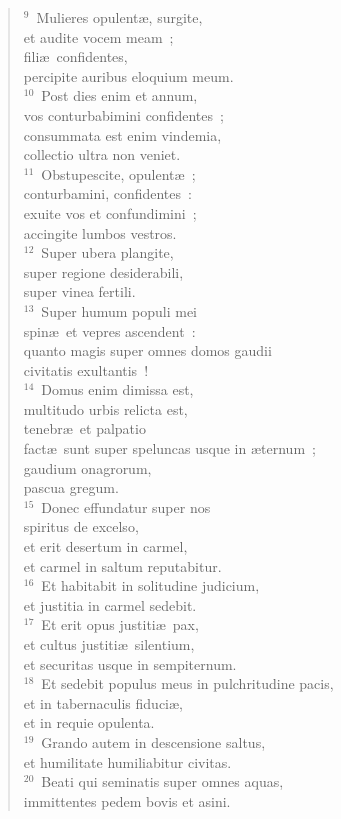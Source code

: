 \begin{verse}${}^{9}$~Mulieres opulent\ae , surgite,\\ et audite vocem meam~;\\ fili\ae\ confidentes,\\ percipite auribus eloquium meum.\\
${}^{10}$~Post dies enim et annum,\\ vos conturbabimini confidentes~;\\ consummata est enim vindemia,\\ collectio ultra non veniet.\\
${}^{11}$~Obstupescite, opulent\ae~;\\ conturbamini, confidentes~:\\ exuite vos et confundimini~;\\ accingite lumbos vestros.\\
${}^{12}$~Super ubera plangite,\\ super regione desiderabili,\\ super vinea fertili.\\
${}^{13}$~Super humum populi mei\\ spin\ae\ et vepres ascendent~:\\ quanto magis super omnes domos gaudii\\ civitatis exultantis~!\\
${}^{14}$~Domus enim dimissa est,\\ multitudo urbis relicta est,\\ tenebr\ae\ et palpatio\\ fact\ae\ sunt super speluncas usque in \ae ternum~;\\ gaudium onagrorum,\\ pascua gregum.\\
${}^{15}$~Donec effundatur super nos\\ spiritus de excelso,\\ et erit desertum in carmel,\\ et carmel in saltum reputabitur.\\
${}^{16}$~Et habitabit in solitudine judicium,\\ et justitia in carmel sedebit.\\
${}^{17}$~Et erit opus justiti\ae\ pax,\\ et cultus justiti\ae\ silentium,\\ et securitas usque in sempiternum.\\
${}^{18}$~Et sedebit populus meus in pulchritudine pacis,\\ et in tabernaculis fiduci\ae ,\\ et in requie opulenta.\\
${}^{19}$~Grando autem in descensione saltus,\\ et humilitate humiliabitur civitas.\\
${}^{20}$~Beati qui seminatis super omnes aquas,\\ immittentes pedem bovis et asini.\end{verse}


